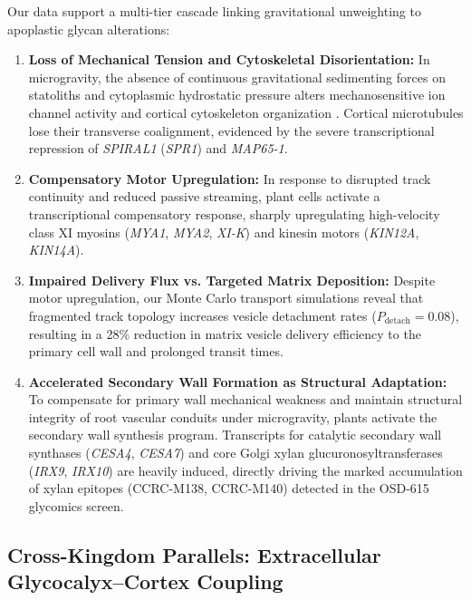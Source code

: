 Our data support a multi-tier cascade linking gravitational unweighting to apoplastic glycan alterations:
\begin{enumerate}
    \item \textbf{Loss of Mechanical Tension and Cytoskeletal Disorientation:} In microgravity, the absence of continuous gravitational sedimenting forces on statoliths and cytoplasmic hydrostatic pressure alters mechanosensitive ion channel activity and cortical cytoskeleton organization \cite{Haswell2011, Monshausen2009}. Cortical microtubules lose their transverse coalignment, evidenced by the severe transcriptional repression of \textit{SPIRAL1} (\textit{SPR1}) and \textit{MAP65-1}.
    \item \textbf{Compensatory Motor Upregulation:} In response to disrupted track continuity and reduced passive streaming, plant cells activate a transcriptional compensatory response, sharply upregulating high-velocity class XI myosins (\textit{MYA1}, \textit{MYA2}, \textit{XI-K}) and kinesin motors (\textit{KIN12A}, \textit{KIN14A}).
    \item \textbf{Impaired Delivery Flux vs. Targeted Matrix Deposition:} Despite motor upregulation, our Monte Carlo transport simulations reveal that fragmented track topology increases vesicle detachment rates ($P_{\text{detach}} = 0.08$), resulting in a 28\% reduction in matrix vesicle delivery efficiency to the primary cell wall and prolonged transit times.
    \item \textbf{Accelerated Secondary Wall Formation as Structural Adaptation:} To compensate for primary wall mechanical weakness and maintain structural integrity of root vascular conduits under microgravity, plants activate the secondary wall synthesis program. Transcripts for catalytic secondary wall synthases (\textit{CESA4}, \textit{CESA7}) and core Golgi xylan glucuronosyltransferases (\textit{IRX9}, \textit{IRX10}) are heavily induced, directly driving the marked accumulation of xylan epitopes (CCRC-M138, CCRC-M140) detected in the OSD-615 glycomics screen.
\end{enumerate}

\subsection{Cross-Kingdom Parallels: Extracellular Glycocalyx--Cortex Coupling}

